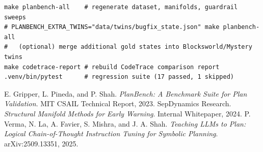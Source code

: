 \documentclass[11pt]{article}
\begin{document}
\begin{lstlisting}[style=stm]
make planbench-all    # regenerate dataset, manifolds, guardrail sweeps
# PLANBENCH_EXTRA_TWINS="data/twins/bugfix_state.json" make planbench-all
#   (optional) merge additional gold states into Blocksworld/Mystery twins
make codetrace-report # rebuild CodeTrace comparison report
.venv/bin/pytest      # regression suite (17 passed, 1 skipped)
\end{lstlisting}

\begin{thebibliography}{9}
 E. Gripper, L. Pineda, and P. Shah. \emph{PlanBench: A Benchmark Suite for Plan Validation}. MIT CSAIL Technical Report, 2023.
 SepDynamics Research. \emph{Structural Manifold Methods for Early Warning}. Internal Whitepaper, 2024.
 P. Verma, N. La, A. Favier, S. Mishra, and J. A. Shah. \emph{Teaching LLMs to Plan: Logical Chain-of-Thought Instruction Tuning for Symbolic Planning}. arXiv:2509.13351, 2025.
\end{thebibliography}
\end{document}
